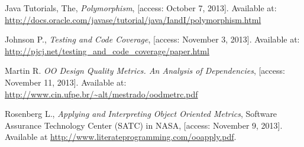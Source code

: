\begin{thebibliography}{100}
	 Java Tutorials, The, {\em Polymorphism}, [access: October 7, 2013]. Available at: \\ \url{http://docs.oracle.com/javase/tutorial/java/IandI/polymorphism.html}	
	
	 Johnson P., {\em Testing and Code Coverage}, [access: November 3, 2013]. Available at: \url{http://pjcj.net/testing_and_code_coverage/paper.html} 
		 	
	 Martin R. {\em OO Design Quality Metrics. An Analysis of Dependencies}, [access: November 11, 2013]. Available at: \url{http://www.cin.ufpe.br/~alt/mestrado/oodmetrc.pdf}
	
	 Rosenberg L., {\em Applying and Interpreting Object Oriented Metrics}, Software Assurance Technology Center (SATC) in NASA, [access: November 9, 2013]. Available at \url{http://www.literateprogramming.com/ooapply.pdf}.
 
\end{thebibliography}